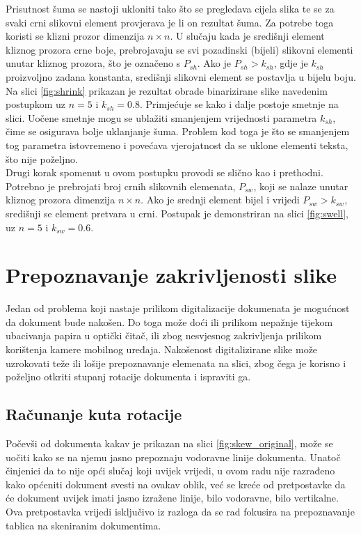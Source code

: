 \documentclass[times, utf8, zavrsni, numeric]{fer}
\begin{document}
Prisutnost šuma se nastoji ukloniti tako što se pregledava cijela slika te se za svaki crni slikovni element provjerava je li on rezultat šuma.
Za potrebe toga koristi se klizni prozor dimenzija $n\times n$.
U slučaju kada je središnji element kliznog prozora crne boje, prebrojavaju se svi pozadinski (bijeli) slikovni elementi unutar kliznog prozora, što je označeno s $P_{sh}$.
Ako je $P_{sh} > k_{sh}$, gdje je $k_{sh}$ proizvoljno zadana konstanta, središnji slikovni element se postavlja u bijelu boju.
Na slici \ref{fig:shrink} prikazan je rezultat obrade binarizirane slike navedenim postupkom uz $n = 5$ i $k_{sh} = 0.8$.
Primjećuje se kako i dalje postoje smetnje na slici.
Uočene smetnje mogu se ublažiti smanjenjem vrijednosti parametra $k_{sh}$, čime se osigurava bolje uklanjanje šuma.
Problem kod toga je što se smanjenjem tog parametra istovremeno i povećava vjerojatnost da se uklone elementi teksta, što nije poželjno.\\

Drugi korak spomenut u ovom postupku provodi se slično kao i prethodni.
Potrebno je prebrojati broj crnih slikovnih elemenata, $P_{sw}$, koji se nalaze unutar kliznog prozora dimenzija $n\times n$.
Ako je srednji element bijel i vrijedi $P_{sw} > k_{sw}$, središnji se element pretvara u crni.
Postupak je demonstriran na slici \ref{fig:swell}, uz $n = 5$ i $k_{sw} = 0.6$.


\chapter{Prepoznavanje zakrivljenosti slike}
\label{ch:skewDetection}
Jedan od problema koji nastaje prilikom digitalizacije dokumenata je mogućnost da dokument bude nakošen. 
Do toga može doći ili prilikom nepažnje tijekom ubacivanja papira u optički čitač, ili zbog nesvjesnog zakrivljenja prilikom korištenja kamere mobilnog uređaja.
Nakošenost digitalizirane slike može uzrokovati teže ili lošije prepoznavanje elemenata na slici, zbog čega je korisno i poželjno otkriti stupanj rotacije dokumenta i ispraviti ga.

\section{Računanje kuta rotacije}
Počevši od dokumenta kakav je prikazan na slici \ref{fig:skew_original}, može se uočiti kako se na njemu jasno prepoznaju vodoravne linije dokumenta.
Unatoč činjenici da to nije opći slučaj koji uvijek vrijedi, u ovom radu nije razrađeno kako općeniti dokument svesti na ovakav oblik, već se kreće od pretpostavke da će dokument uvijek imati jasno izražene linije, bilo vodoravne, bilo vertikalne.
Ova pretpostavka vrijedi isključivo iz razloga da se rad fokusira na prepoznavanje tablica na skeniranim dokumentima.\\
\end{document}
